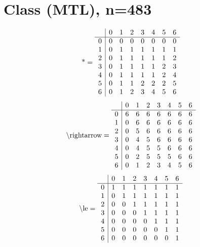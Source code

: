 \documentclass[11pt]{article}
\begin{document}
\section{Class (MTL), n=483}
\[\text{*} = 
\begin{array}{r | r r r r r r r}
 & 0 & 1 & 2 & 3 & 4 & 5 & 6 \\ \hline
0 & 0 & 0 & 0 & 0 & 0 & 0 & 0 \\
1 & 0 & 1 & 1 & 1 & 1 & 1 & 1 \\
2 & 0 & 1 & 1 & 1 & 1 & 1 & 2 \\
3 & 0 & 1 & 1 & 1 & 1 & 2 & 3 \\
4 & 0 & 1 & 1 & 1 & 1 & 2 & 4 \\
5 & 0 & 1 & 1 & 2 & 2 & 2 & 5 \\
6 & 0 & 1 & 2 & 3 & 4 & 5 & 6 \\
\end{array}
\]
\[\text{\textbackslash rightarrow} = 
\begin{array}{r | r r r r r r r}
 & 0 & 1 & 2 & 3 & 4 & 5 & 6 \\ \hline
0 & 6 & 6 & 6 & 6 & 6 & 6 & 6 \\
1 & 0 & 6 & 6 & 6 & 6 & 6 & 6 \\
2 & 0 & 5 & 6 & 6 & 6 & 6 & 6 \\
3 & 0 & 4 & 5 & 6 & 6 & 6 & 6 \\
4 & 0 & 4 & 5 & 5 & 6 & 6 & 6 \\
5 & 0 & 2 & 5 & 5 & 5 & 6 & 6 \\
6 & 0 & 1 & 2 & 3 & 4 & 5 & 6 \\
\end{array}
\]
\[\text{\textbackslash le} = 
\begin{array}{r | r r r r r r r}
 & 0 & 1 & 2 & 3 & 4 & 5 & 6 \\ \hline
0 & 1 & 1 & 1 & 1 & 1 & 1 & 1 \\
1 & 0 & 1 & 1 & 1 & 1 & 1 & 1 \\
2 & 0 & 0 & 1 & 1 & 1 & 1 & 1 \\
3 & 0 & 0 & 0 & 1 & 1 & 1 & 1 \\
4 & 0 & 0 & 0 & 0 & 1 & 1 & 1 \\
5 & 0 & 0 & 0 & 0 & 0 & 1 & 1 \\
6 & 0 & 0 & 0 & 0 & 0 & 0 & 1 \\
\end{array}
\]
\end{document}
